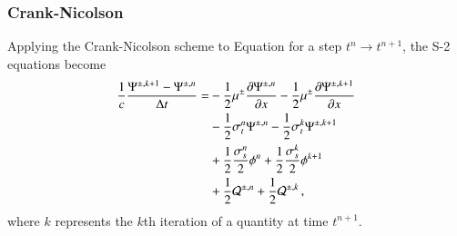 \documentclass[preprint,12pt]{elsarticle}
\begin{document}
\subsubsection{Crank-Nicolson}
Applying the Crank-Nicolson scheme to Equation  for a step
$t^n\rightarrow t^{n+1}$, the S-2 equations become
\begin{equation}\lequ{S2CN}\begin{split}
  \frac{1}{c}\frac{\Psi^{\pm,k+1}-\Psi^{\pm,n}}{\dt} = &
  -\half\mu^\pm\dydx{\Psi^{\pm,n}} -\half\mu^\pm\dydx{\Psi^{\pm,k+1}}\\
  &-\half\sigma_t^n\Psi^{\pm,n} -\half\sigma_t^k\Psi^{\pm,k+1}\\
  &+\half\frac{\sigma_s^n}{2}\phi^n +\half\frac{\sigma_s^k}{2}\phi^{k+1}\\
  &+\half\Q^{\pm,n} +\half\Q^{\pm,k} \pec
\end{split}\end{equation}
where $k$ represents the $k$th iteration of a quantity at time $t^{n+1}$.
\end{document}
